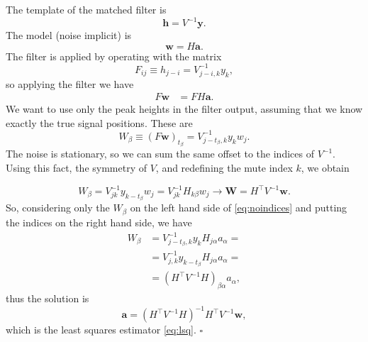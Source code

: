 The template of the matched filter is
%
\begin{equation}
    \mathbf h = V^{-1} \mathbf y.
\end{equation}
%
The model (noise implicit) is
%
\begin{equation}
    \mathbf w = H \mathbf a.
\end{equation}
%
The filter is applied by operating with the matrix
\begin{equation}
    F_{ij} \equiv h_{j-i} = V^{-1}_{j-i,k} y_k,
\end{equation}
%
so applying the filter we have
%
\begin{align}
    F \mathbf w &= F H \mathbf a. \label{eq:noindices}
\end{align}
%
We want to use only the peak heights in the filter output, assuming that we
know exactly the true signal positions. These are
%
\begin{equation}
    W_\beta \equiv (F \mathbf w)_{t_\beta} = V^{-1}_{j-t_\beta,k} y_k w_j. 
\end{equation}
%
The noise is stationary, so we can sum the same offset to the indices of
$V^{-1}$. Using this fact, the symmetry of $V$, and redefining the mute index
$k$, we obtain


\begin{equation}
    W_\beta = V^{-1}_{jk} y_{k-t_\beta} w_j = V^{-1}_{jk} H_{k\beta} w_j
    \rightarrow \mathbf W = H^\top V^{-1} \mathbf w.
\end{equation}
%
So, considering only the $W_\beta$ on the left hand side of
\eqref{eq:noindices} and putting the indices on the right hand side, we have
%
\begin{align}
    W_\beta &= V^{-1}_{j-t_\beta,k} y_k H_{j\alpha} a_\alpha = \\
    &= V^{-1}_{j,k} y_{k-t_\beta} H_{j\alpha} a_\alpha = \\
    &= (H^\top V^{-1} H)_{\beta\alpha} a_\alpha,
\end{align}
%
thus the solution is
%
\begin{equation}
    \mathbf a = (H^\top V^{-1} H)^{-1} H^\top V^{-1} \mathbf w,
\end{equation}
%
which is the least squares estimator \eqref{eq:lsq}. \hfill $\square$

